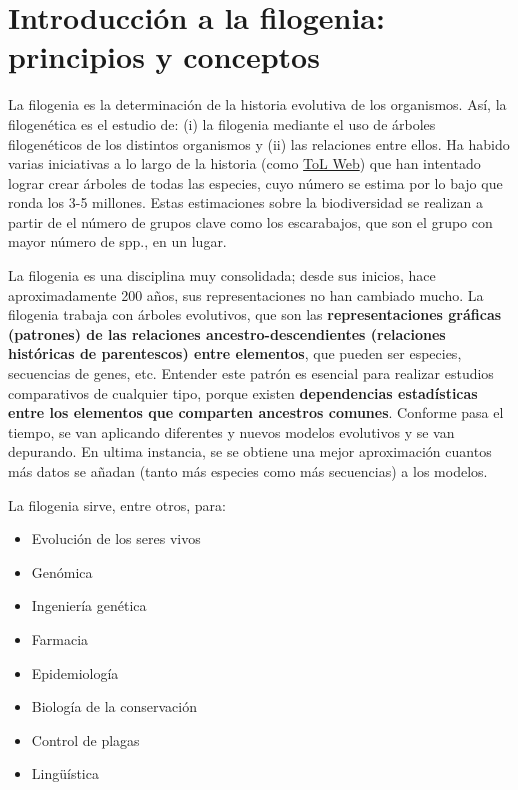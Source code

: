 \chapter{Introducción a la filogenia: principios y conceptos}
La filogenia es la determinación de la historia evolutiva de los organismos. Así, la filogenética es el estudio de: (i) la filogenia mediante el uso de árboles filogenéticos de los distintos organismos y (ii) las relaciones entre ellos. Ha habido varias iniciativas a lo largo de la historia (como \href{http://tolweb.org}{ToL Web}) que han intentado lograr crear árboles de todas las especies, cuyo número se estima por lo bajo que ronda los 3-5 millones. Estas estimaciones sobre la biodiversidad se realizan a partir de el número de grupos clave como los escarabajos, que son el grupo con mayor número de spp., en un lugar.

La filogenia es una disciplina muy consolidada; desde sus inicios, hace aproximadamente 200 años, sus representaciones no han cambiado mucho. La filogenia trabaja con árboles evolutivos, que son las \textbf{representaciones gráficas (patrones) de las relaciones ancestro-descendientes (relaciones históricas de parentescos) entre elementos}, que pueden ser especies, secuencias de genes, etc. Entender este patrón es esencial para realizar estudios comparativos de cualquier tipo, porque existen\textbf{ dependencias estadísticas entre los elementos que comparten ancestros comunes}. Conforme pasa el tiempo, se van aplicando diferentes y nuevos modelos evolutivos y se van depurando. En ultima instancia, se se obtiene una mejor aproximación cuantos más datos se añadan (tanto más especies como más secuencias) a los modelos.

La filogenia sirve, entre otros, para: \begin{itemize}
\item Evolución de los seres vivos
\item Genómica
\item Ingeniería genética
\item Farmacia
\item Epidemiología
\item Biología de la conservación
\item Control de plagas
\item Lingüística
\end{itemize}

